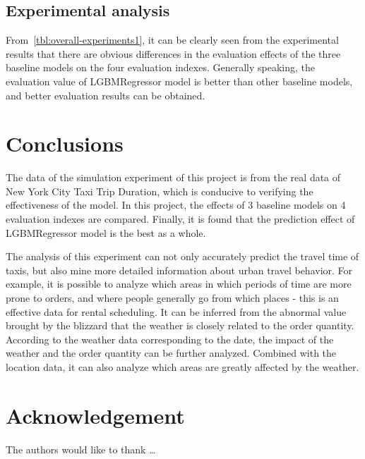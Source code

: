 \documentclass{amsart}
\begin{document}
\subsection{Experimental analysis}
From~\cref{tbl:overall-experiments1}, it can be clearly seen from the experimental results that there are obvious differences in the evaluation effects of the three baseline models on the four evaluation indexes. Generally speaking, the evaluation value of LGBMRegressor model is better than other baseline models, and better evaluation results can be obtained.



\section{Conclusions} \label{sec-conclusions}
The data of the simulation experiment of this project is from the real data of New York City Taxi Trip Duration, which is conducive to verifying the effectiveness of the model. In this project, the effects of 3 baseline models on 4 evaluation indexes are compared. Finally, it is found that the prediction effect of LGBMRegressor model is the best as a whole.

The analysis of this experiment can not only accurately predict the travel time of taxis, but also mine more detailed information about urban travel behavior. For example, it is possible to analyze which areas in which periods of time are more prone to orders, and where people generally go from which places - this is an effective data for rental scheduling. It can be inferred from the abnormal value brought by the blizzard that the weather is closely related to the order quantity. According to the weather data corresponding to the date, the impact of the weather and the order quantity can be further analyzed. Combined with the location data, it can also analyze which areas are greatly affected by the weather.

\section*{Acknowledgement}

\lipsum[1]


The authors would like to thank \ldots



\newpage



\listoftodos
\end{document}
